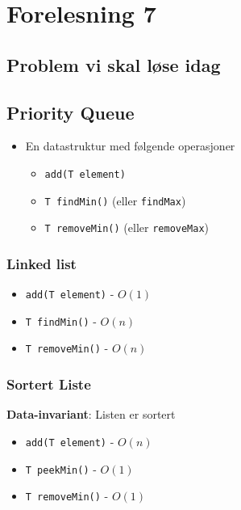 \documentclass{article}
\begin{document}
    \section{Forelesning 7}

    \subsection{Problem vi skal løse idag}

    \subsection{Priority Queue}

    \begin{itemize}
        \item En datastruktur med følgende operasjoner
        \begin{itemize}
            \item \texttt{add(T element)}
            \item \texttt{T findMin()} (eller \texttt{findMax})
            \item \texttt{T removeMin()} (eller \texttt{removeMax})
        \end{itemize}
    \end{itemize}

    \subsubsection{Linked list}
    \begin{itemize}
        \item \texttt{add(T element)} - \( O\left( 1 \right) \)
        \item \texttt{T findMin()} - \( O\left( n \right) \)
        \item \texttt{T removeMin()} - \( O\left( n \right) \)
   \end{itemize}

   \subsubsection{Sortert Liste}
   \textbf{Data-invariant}: Listen er sortert

   \begin{itemize}
        \item \texttt{add(T element)} - \( O\left( n \right) \)
        \item \texttt{T peekMin()} - \( O\left( 1 \right) \)
        \item \texttt{T removeMin()} - \( O\left( 1 \right) \)
   \end{itemize}
\end{document}
